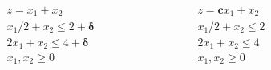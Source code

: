 $$
\begin{array}{ccc}
    \begin{aligned}
        & z = x_1 + x_2 \\
        & x_1 / 2 + x_2 \le 2 + \boldsymbol{\delta} \\
        & 2 x_1 + x_2 \le 4 + \boldsymbol{\delta} \\
        & x_1, x_2 \ge 0
    \end{aligned} &
    \hspace{1in} &
    \begin{aligned}
        & z = \mathbf{c} x_1 + x_2 \\
        & x_1 / 2 + x_2 \le 2 \\
        & 2 x_1 + x_2 \le 4 \\
        & x_1, x_2 \ge 0
    \end{aligned}
\end{array}
$$
